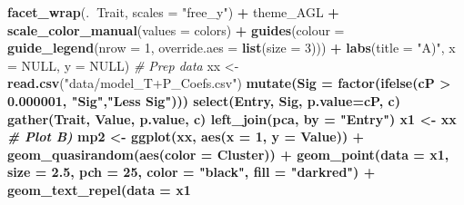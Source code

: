 \documentclass[
]{article}
\newenvironment{Shaded}{\begin{snugshade}}{\end{snugshade}}
\newcommand{\CommentTok}[1]{\textcolor[rgb]{0.56,0.35,0.01}{\textit{#1}}}
\newcommand{\DataTypeTok}[1]{\textcolor[rgb]{0.13,0.29,0.53}{#1}}
\newcommand{\DecValTok}[1]{\textcolor[rgb]{0.00,0.00,0.81}{#1}}
\newcommand{\FloatTok}[1]{\textcolor[rgb]{0.00,0.00,0.81}{#1}}
\newcommand{\KeywordTok}[1]{\textcolor[rgb]{0.13,0.29,0.53}{\textbf{#1}}}
\newcommand{\NormalTok}[1]{#1}
\newcommand{\OperatorTok}[1]{\textcolor[rgb]{0.81,0.36,0.00}{\textbf{#1}}}
\newcommand{\OtherTok}[1]{\textcolor[rgb]{0.56,0.35,0.01}{#1}}
\newcommand{\StringTok}[1]{\textcolor[rgb]{0.31,0.60,0.02}{#1}}
\begin{document}
\begin{Shaded}
\begin{Highlighting}[]
{{{{{{\StringTok{  }\KeywordTok{facet_wrap}\NormalTok{(.}\OperatorTok{~}\NormalTok{Trait, }\DataTypeTok{scales =} \StringTok{"free_y"}\NormalTok{) }\OperatorTok{+}
\StringTok{  }\NormalTok{theme_AGL }\OperatorTok{+}
\StringTok{  }\KeywordTok{scale_color_manual}\NormalTok{(}\DataTypeTok{values =}\NormalTok{ colors) }\OperatorTok{+}
\StringTok{  }\KeywordTok{guides}\NormalTok{(}\DataTypeTok{colour =} \KeywordTok{guide_legend}\NormalTok{(}\DataTypeTok{nrow =} \DecValTok{1}\NormalTok{, }\DataTypeTok{override.aes =} \KeywordTok{list}\NormalTok{(}\DataTypeTok{size =} \DecValTok{3}\NormalTok{))) }\OperatorTok{+}
\StringTok{  }\KeywordTok{labs}\NormalTok{(}\DataTypeTok{title =} \StringTok{"A)"}\NormalTok{, }\DataTypeTok{x =} \OtherTok{NULL}\NormalTok{, }\DataTypeTok{y =} \OtherTok{NULL}\NormalTok{)}
\CommentTok{# Prep data}
\NormalTok{xx <-}\StringTok{ }\KeywordTok{read.csv}\NormalTok{(}\StringTok{"data/model_T+P_Coefs.csv"}\NormalTok{) }\OperatorTok{%
\StringTok{  }\KeywordTok{mutate}\NormalTok{(}\DataTypeTok{Sig =} \KeywordTok{factor}\NormalTok{(}\KeywordTok{ifelse}\NormalTok{(cP }\OperatorTok{>}\StringTok{ }\FloatTok{0.000001}\NormalTok{, }\StringTok{"Sig"}\NormalTok{,}\StringTok{"Less Sig"}\NormalTok{))) }\OperatorTok{%
\StringTok{  }\KeywordTok{select}\NormalTok{(Entry, Sig, }\DataTypeTok{p.value=}\NormalTok{cP, c) }\OperatorTok{%
\StringTok{  }\KeywordTok{gather}\NormalTok{(Trait, Value, p.value, c) }\OperatorTok{%
\StringTok{  }\KeywordTok{left_join}\NormalTok{(pca, }\DataTypeTok{by =} \StringTok{"Entry"}\NormalTok{)}
\NormalTok{x1 <-}\StringTok{ }\NormalTok{xx }\OperatorTok{%
\CommentTok{# Plot B)}
\NormalTok{mp2 <-}\StringTok{ }\KeywordTok{ggplot}\NormalTok{(xx, }\KeywordTok{aes}\NormalTok{(}\DataTypeTok{x =} \DecValTok{1}\NormalTok{, }\DataTypeTok{y =}\NormalTok{ Value)) }\OperatorTok{+}
\StringTok{  }\KeywordTok{geom_quasirandom}\NormalTok{(}\KeywordTok{aes}\NormalTok{(}\DataTypeTok{color =}\NormalTok{ Cluster)) }\OperatorTok{+}
\StringTok{  }\KeywordTok{geom_point}\NormalTok{(}\DataTypeTok{data =}\NormalTok{ x1, }\DataTypeTok{size =} \FloatTok{2.5}\NormalTok{, }\DataTypeTok{pch =} \DecValTok{25}\NormalTok{, }\DataTypeTok{color =} \StringTok{"black"}\NormalTok{, }\DataTypeTok{fill =} \StringTok{"darkred"}\NormalTok{) }\OperatorTok{+}
\StringTok{  }\KeywordTok{geom_text_repel}\NormalTok{(}\DataTypeTok{data =}\NormalTok{ x1 }\OperatorTok{%
}}}}}}}}}}}}
\end{Highlighting}
\end{Shaded}
\end{document}
